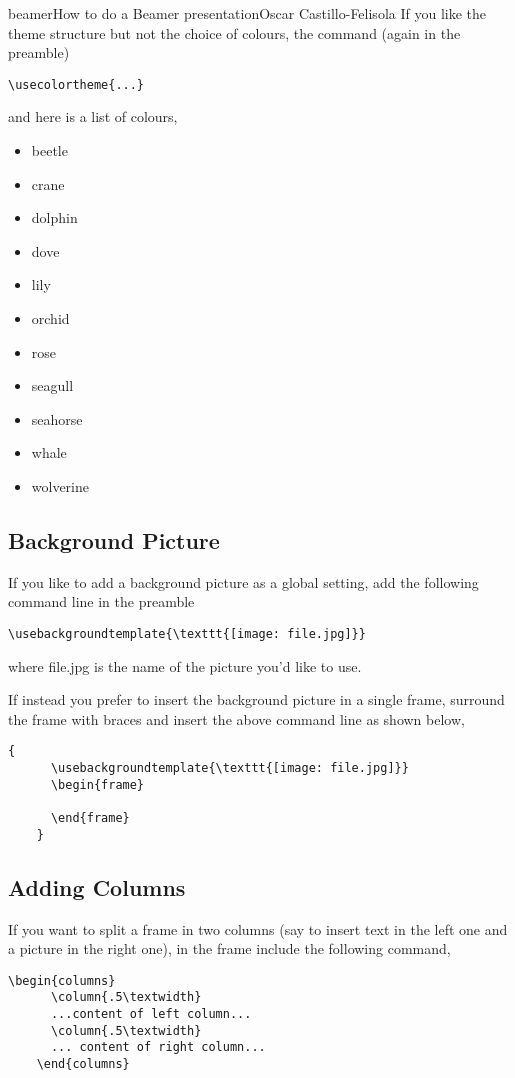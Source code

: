 \begin{article}[2]{beamer}{How to do a Beamer presentation}{Oscar Castillo-Felisola}
  If you like the theme structure but not the choice of colours, the command (again in the preamble)
  \begin{lstlisting}[style=LaTeX]
    \usecolortheme{...}
  \end{lstlisting}
  and here is a list of colours,
  \begin{itemize}
  \item beetle
  \item crane
  \item dolphin
  \item dove
  \item lily
  \item orchid
  \item rose
  \item seagull
  \item seahorse
  \item whale
  \item wolverine
  \end{itemize}

  \subsection{Background Picture}

  If you like to add a background picture as a global setting, add the following command line in the preamble
  \begin{lstlisting}[style=LaTeX]
    \usebackgroundtemplate{\texttt{[image: file.jpg]}}
  \end{lstlisting}
  where file.jpg is the name of the picture you’d like to use.

  If instead you prefer to insert the background picture in a single frame, surround the frame with braces and insert the above command line as shown below,
  \begin{lstlisting}[style=LaTeX]
    {
      \usebackgroundtemplate{\texttt{[image: file.jpg]}}
      \begin{frame}

      \end{frame}
    }
  \end{lstlisting}

  \subsection{Adding Columns}

  If you want to split a frame in two columns (say to insert text in the left one and a picture in the right one), in the frame include the following command,
  \begin{lstlisting}[style=LaTeX]
    \begin{columns}
      \column{.5\textwidth}
      ...content of left column...
      \column{.5\textwidth}
      ... content of right column...
    \end{columns}
  \end{lstlisting}


\end{article}
